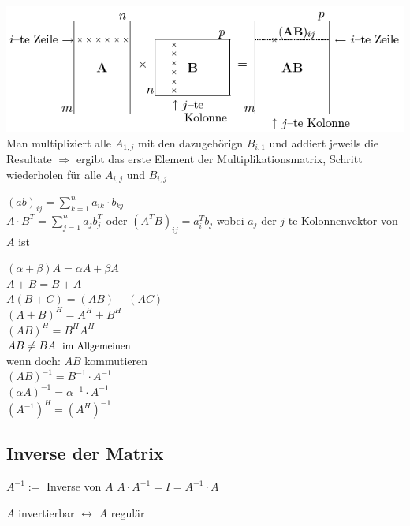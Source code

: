 \documentclass[a4paper,twocolumn]{article}
\begin{document}
		\begin{falgo}[Multiplkationsalgorithmus]
			\includegraphics[width=\textwidth]{matrix_multiplikation}
			Man multipliziert alle $A_{1,j}$ mit den dazugehörign $B_{i,1}$ und addiert jeweils die Resultate $\Rightarrow$ ergibt 
			das erste Element der Multiplikationsmatrix, Schritt wiederholen für alle $A_{i,j}$ und $B_{i,j}$
		\end{falgo}
		
		$(ab)_{ij}=\sum_{k=1}^n a_{ik}\cdot b_{kj}$\\[1mm]
			$A \cdot B^T = \sum^n_{j = 1} a_j b_j^T$ oder $(A^T B)_{ij} = a_i^T b_j$ wobei $a_j$ der $j$-te Kolonnenvektor von $A$ ist
			
		\begin{fregeln}
			\vspace{-5mm}
			\begin{multicols}{2}
			$(\alpha + \beta)A = \alpha A + \beta A$\\
			$A + B = B + A$\\
			$A(B + C) = (AB) + (AC)$\\
			$(A + B)^H = A^H + B^H$\\
			$(AB)^H = B^H A^H$\\
			$AB \ne BA \; \text{ \small im Allgemeinen}$\\\small wenn doch: $AB$ kommutieren\\
			$(AB)^{-1} = B^{-1} \cdot A^{-1}$\\
			$(\alpha A)^{-1} = \alpha^{-1} \cdot A^{-1}$\\
			$(A^{-1})^H = (A^H)^{-1}$
			\end{multicols}
			\vspace{-3mm}
	\end{fregeln}
	\subsection{Inverse der Matrix}
		\begin{fdef}
			$A^{-1} := $ Inverse von $A$ \hspace{4mm} $A \cdot A^{-1} = I = A^{-1} \cdot A$
		\end{fdef}
			\vspace{-2.5mm}
			$A$ invertierbar $\leftrightarrow$ $A$ regulär
		
\end{document}

